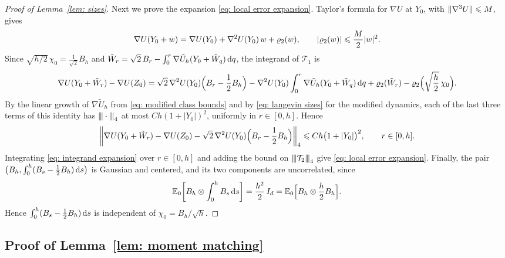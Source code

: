 \begin{proof}[Proof of Lemma~\ref{lem: sizes}]
    Next we prove the expansion \eqref{eq: local error expansion}. Taylor's formula for $\nabla U$ at $Y_0$, with $\lVert \nabla^3 U \rVert \leqslant M$, gives
    \begin{equation*}
        \nabla U(Y_0 + w) = \nabla U(Y_0) + \nabla^2 U(Y_0)\, w + \varrho_2(w) , \qquad |\varrho_2(w)| \leqslant \frac M2 |w|^2 .
    \end{equation*}
    Since $\sqrt{h/2}\, \chi_0 = \frac{1}{\sqrt2} B_h$ and $\tilde W_r = \sqrt2\, B_r - \int_0^r \nabla \tilde U_h(Y_0 + \tilde W_q)\, \mathrm{d} q$, the integrand of $\mathcal T_1$ is
    \begin{equation*}
        \nabla U( Y_0 + \tilde W_r ) - \nabla U( Z_0 ) = \sqrt2\, \nabla^2 U(Y_0) \Bigl( B_r - \frac12 B_h \Bigr) - \nabla^2 U(Y_0) \int_0^r \nabla \tilde U_h(Y_0 + \tilde W_q)\, \mathrm{d} q + \varrho_2(\tilde W_r) - \varrho_2\Bigl( \sqrt{\frac h2}\, \chi_0 \Bigr) .
    \end{equation*}
    By the linear growth of $\nabla \tilde U_h$ from \eqref{eq: modified class bounds} and by \eqref{eq: langevin sizes} for the modified dynamics, each of the last three terms of this identity has ${\vert\kern-0.25ex\vert\kern-0.25ex\vert} \cdot {\vert\kern-0.25ex\vert\kern-0.25ex\vert}_4$ at most $C h (1+|Y_0|)^2$, uniformly in $r \in [0,h]$. Hence
    \begin{equation}
        \biggl\| \nabla U( Y_0 + \tilde W_r ) - \nabla U( Z_0 ) - \sqrt2\, \nabla^2 U(Y_0) \Bigl( B_r - \frac12 B_h \Bigr) \biggr\|_4 \leqslant C h \bigl( 1+|Y_0| \bigr)^2 , \qquad r \in [0,h] .
        \label{eq: integrand expansion}
    \end{equation}
    Integrating \eqref{eq: integrand expansion} over $r \in [0,h]$ and adding the bound on ${\vert\kern-0.25ex\vert\kern-0.25ex\vert} \mathcal T_2 {\vert\kern-0.25ex\vert\kern-0.25ex\vert}_4$ give \eqref{eq: local error expansion}. Finally, the pair $\bigl( B_h, \int_0^h ( B_s - \frac12 B_h )\, \mathrm{d} s \bigr)$ is Gaussian and centered, and its two components are uncorrelated, since
    \begin{equation*}
        \mathbb E_0\biggl[ B_h \otimes \int_0^h B_s\, \mathrm{d} s \biggr] = \frac{h^2}{2}\, I_d = \mathbb E_0\Bigl[ B_h \otimes \frac h2 B_h \Bigr] .
    \end{equation*}
    Hence $\int_0^h ( B_s - \frac12 B_h )\, \mathrm{d} s$ is independent of $\chi_0 = B_h / \sqrt h$.
\end{proof}

\subsection{Proof of Lemma~\ref{lem: moment matching}}
\label{sec: matching proof}

